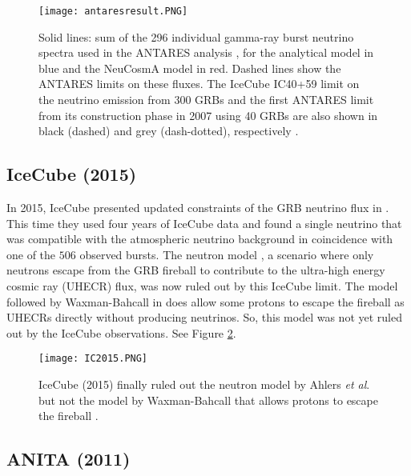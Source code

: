 \documentclass[12pt]{article}
\begin{document}
\begin{doublespace}
\begin{figure}[H]
\centering
\texttt{[image: antaresresult.PNG]}
\caption{Solid lines: sum of the 296 individual gamma-ray burst neutrino spectra used in the ANTARES analysis \cite{antares}, for the analytical model \cite{guetta} in blue and the NeuCosmA model \cite{Hummer, MBthesis} in red. Dashed lines show the ANTARES limits on these fluxes. The IceCube IC40+59 limit \cite{IC2012} on the neutrino emission from 300 GRBs and the first ANTARES limit from its construction phase in 2007 using 40 GRBs are also shown in black (dashed) and grey (dash-dotted), respectively \cite{antares}.}
\label{antaresresult}
\end{figure}

\subsection{IceCube (2015)}
In 2015, IceCube presented updated constraints of the GRB neutrino flux in \cite{IC2015}. This time they used four years of IceCube data and found a single neutrino that was compatible with the atmospheric neutrino background in coincidence with one of the $506$ observed bursts. The neutron model \cite{ahlers}, a scenario where only neutrons escape from the GRB fireball to contribute to the ultra-high energy cosmic ray (UHECR) flux, was now ruled out by this IceCube limit. The model followed by Waxman-Bahcall in \cite{firstcalc,WBub,afterglows,ubrobust} does allow some protons to escape the fireball as UHECRs directly without producing neutrinos. So, this model was not yet ruled out by the IceCube observations. See Figure \ref{IC2015}. 

\begin{figure}[H]
\centering
\texttt{[image: IC2015.PNG]}
\caption{IceCube (2015) finally ruled out the neutron model by Ahlers \textit{et al}. \cite{ahlers} but not the model by Waxman-Bahcall \cite{firstcalc} that allows protons to escape the fireball \cite{IC2015}.}
\label{IC2015}
\end{figure}

\subsection{ANITA (2011)}


\end{doublespace}
\end{document}
